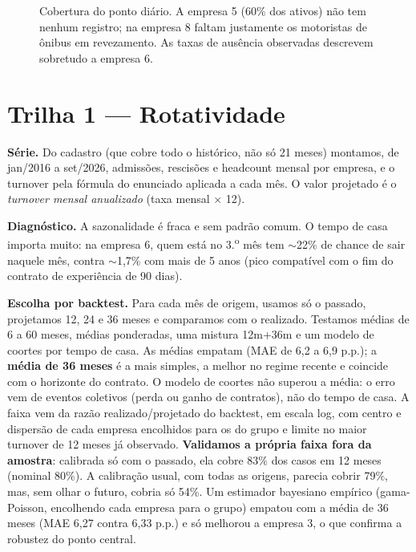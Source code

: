 \documentclass[11pt,a4paper]{article}
\begin{document}
\begin{figure}[htbp]
\centering
{}
\caption{Cobertura do ponto diário. A empresa 5 (60\% dos ativos) não tem nenhum registro; na empresa 8 faltam justamente os motoristas de ônibus em revezamento. As taxas de ausência observadas descrevem sobretudo a empresa 6.}
\end{figure}

\section{Trilha 1 --- Rotatividade}\label{sec:t1}
\textbf{Série.} Do cadastro (que cobre todo o histórico, não só 21 meses) montamos, de jan/2016 a set/2026, admissões, rescisões e headcount mensal por empresa, e o turnover pela fórmula do enunciado aplicada a cada mês. O valor projetado é o \emph{turnover mensal anualizado} (taxa mensal $\times$ 12).

\textbf{Diagnóstico.} A sazonalidade é fraca e sem padrão comum. O tempo de casa importa muito: na empresa 6, quem está no 3.\textsuperscript{o} mês tem $\sim$22\% de chance de sair naquele mês, contra $\sim$1,7\% com mais de 5 anos (pico compatível com o fim do contrato de experiência de 90 dias).

\textbf{Escolha por backtest.} Para cada mês de origem, usamos só o passado, projetamos 12, 24 e 36 meses e comparamos com o realizado. Testamos médias de 6 a 60 meses, médias ponderadas, uma mistura 12m+36m e um modelo de coortes por tempo de casa. As médias empatam (MAE de 6,2 a 6,9 p.p.); a \textbf{média de 36 meses} é a mais simples, a melhor no regime recente e coincide com o horizonte do contrato. O modelo de coortes não superou a média: o erro vem de eventos coletivos (perda ou ganho de contratos), não do tempo de casa. A faixa vem da razão realizado/projetado do backtest, em escala log, com centro e dispersão de cada empresa encolhidos para os do grupo e limite no maior turnover de 12 meses já observado. \textbf{Validamos a própria faixa fora da amostra}: calibrada só com o passado, ela cobre 83\% dos casos em 12 meses (nominal 80\%). A calibração usual, com todas as origens, parecia cobrir 79\%, mas, sem olhar o futuro, cobria só 54\%. Um estimador bayesiano empírico (gama-Poisson, encolhendo cada empresa para o grupo) empatou com a média de 36 meses (MAE 6,27 contra 6,33 p.p.) e só melhorou a empresa 3, o que confirma a robustez do ponto central.
\end{document}
